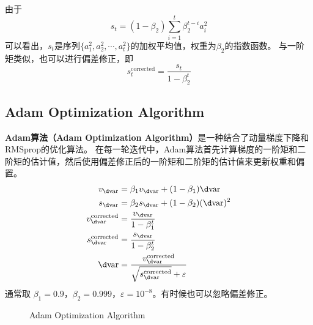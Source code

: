 由于
\begin{equation}
    s_t = (1 - \beta_2)\sum_{i=1}^t\beta_2^{t-i}a_i^2
\end{equation}
可以看出，$s_t$是序列$\{a_1^2, a_2^2, \cdots, a_t^2\}$的加权平均值，权重为$\beta_2$的指数函数。
与一阶矩类似，也可以进行偏差修正，即
\begin{equation}
    s_t^{\mathrm{corrected}} = \frac{s_t}{1 - \beta_2^t}
\end{equation}

\subsection{Adam Optimization Algorithm}

\textbf{Adam算法（Adam Optimization Algorithm）}是一种结合了动量梯度下降和RMSprop的优化算法。
在每一轮迭代中，Adam算法首先计算梯度的一阶矩和二阶矩的估计值，然后使用偏差修正后的一阶矩和二阶矩的估计值来更新权重和偏置。
\begin{equation}
    \begin{aligned}
        v_{\d \mathrm{var}} &= \beta_1 v_{\d \mathrm{var}} + (1 - \beta_1)\d \mathrm{var} \\
        s_{\d \mathrm{var}} &= \beta_2 s_{\d \mathrm{var}} + (1 - \beta_2)(\d \mathrm{var})^2 \\
        v_{\d \mathrm{var}}^{\mathrm{corrected}} &= \frac{v_{\d \mathrm{var}}}{1 - \beta_1^t} \\
        s_{\d \mathrm{var}}^{\mathrm{corrected}} &= \frac{s_{\d \mathrm{var}}}{1 - \beta_2^t} \\
        \d \mathrm{var} &= \frac{v_{\d \mathrm{var}}^{\mathrm{corrected}}}{\sqrt{s_{\d \mathrm{var}}^{\mathrm{corrected}}} + \varepsilon}
    \end{aligned}
\end{equation}
通常取 $\beta_1 = 0.9$，$\beta_2 = 0.999$，$\varepsilon = 10^{-8}$。有时候也可以忽略偏差修正。

\begin{figure}[h!bt]
    \centering
    \centering
    \caption{Adam Optimization Algorithm}
    \label{fig:adam}
\end{figure}

